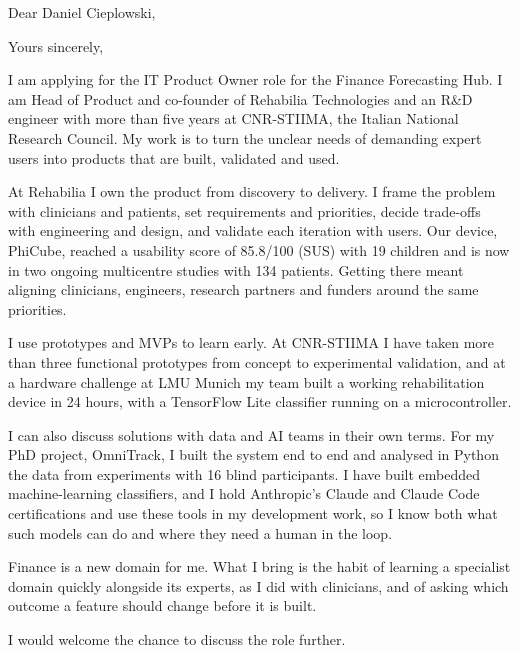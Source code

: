 \documentclass[11pt,a4paper,sans]{moderncv}
\begin{document}

\opening{Dear Daniel Cieplowski,}
\closing{Yours sincerely,}
\makelettertitle

I am applying for the IT Product Owner role for the Finance Forecasting Hub. I am Head of Product and co-founder of Rehabilia Technologies and an R\&D engineer with more than five years at CNR-STIIMA, the Italian National Research Council. My work is to turn the unclear needs of demanding expert users into products that are built, validated and used.

At Rehabilia I own the product from discovery to delivery. I frame the problem with clinicians and patients, set requirements and priorities, decide trade-offs with engineering and design, and validate each iteration with users. Our device, PhiCube, reached a usability score of 85.8/100 (SUS) with 19 children and is now in two ongoing multicentre studies with 134 patients. Getting there meant aligning clinicians, engineers, research partners and funders around the same priorities.

I use prototypes and MVPs to learn early. At CNR-STIIMA I have taken more than three functional prototypes from concept to experimental validation, and at a hardware challenge at LMU Munich my team built a working rehabilitation device in 24 hours, with a TensorFlow Lite classifier running on a microcontroller.

I can also discuss solutions with data and AI teams in their own terms. For my PhD project, OmniTrack, I built the system end to end and analysed in Python the data from experiments with 16 blind participants. I have built embedded machine-learning classifiers, and I hold Anthropic's Claude and Claude Code certifications and use these tools in my development work, so I know both what such models can do and where they need a human in the loop.

Finance is a new domain for me. What I bring is the habit of learning a specialist domain quickly alongside its experts, as I did with clinicians, and of asking which outcome a feature should change before it is built.

I would welcome the chance to discuss the role further.

\makeletterclosing
\end{document}
